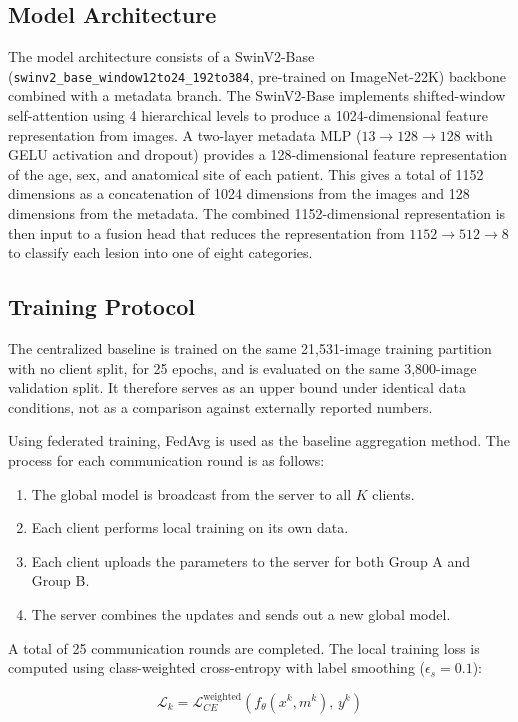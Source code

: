 \documentclass[utf8]{FrontiersinHarvard} %
\begin{document}
\subsection{Model Architecture}

The model architecture consists of a SwinV2-Base (\texttt{swinv2\_base\_window12to24\_192to384}, pre-trained on ImageNet-22K) backbone combined with a metadata branch. The SwinV2-Base implements shifted-window self-attention using 4 hierarchical levels to produce a 1024-dimensional feature representation from images. A two-layer metadata MLP ($13 \to 128 \to 128$ with GELU activation and dropout) provides a 128-dimensional feature representation of the age, sex, and anatomical site of each patient. This gives a total of 1152 dimensions as a concatenation of 1024 dimensions from the images and 128 dimensions from the metadata. The combined 1152-dimensional representation is then input to a fusion head that reduces the representation from $1152 \to 512 \to 8$ to classify each lesion into one of eight categories.

\subsection{Training Protocol}

The centralized baseline is trained on the same 21,531-image training partition with no client split, for 25 epochs, and is evaluated on the same 3,800-image validation split. It therefore serves as an upper bound under identical data conditions, not as a comparison against externally reported numbers.

Using federated training, FedAvg is used as the baseline aggregation method. The process for each communication round is as follows:
\begin{enumerate}
    \item The global model is broadcast from the server to all $K$ clients.
    \item Each client performs local training on its own data.
    \item Each client uploads the parameters to the server for both Group A and Group B.
    \item The server combines the updates and sends out a new global model.
\end{enumerate}
A total of 25 communication rounds are completed. The local training loss is computed using class-weighted cross-entropy with label smoothing ($\epsilon_s = 0.1$):

\begin{equation}
\label{eq:local_loss}
\mathcal{L}_k = \mathcal{L}_{CE}^{\text{weighted}}(f_{\theta}(x^k, m^k),\, y^k)
\end{equation}
\end{document}
